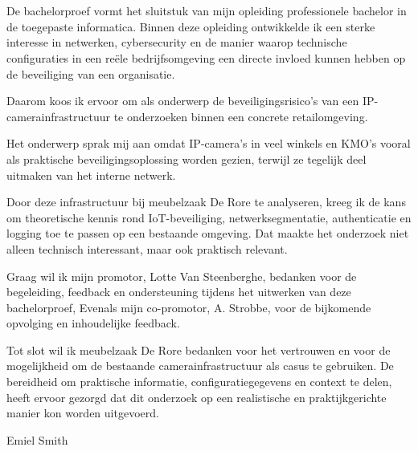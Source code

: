 
\chapter*{}%
\label{ch:voorwoord}


De bachelorproef vormt het sluitstuk van mijn opleiding professionele bachelor in de toegepaste informatica. Binnen deze opleiding ontwikkelde ik een sterke interesse in netwerken, cybersecurity en de manier waarop technische configuraties in een reële bedrijfsomgeving een directe invloed kunnen hebben op de beveiliging van een organisatie. 

Daarom koos ik ervoor om als onderwerp de beveiligingsrisico's van een IP-camerainfrastructuur te onderzoeken binnen een concrete retailomgeving.

Het onderwerp sprak mij aan omdat IP-camera's in veel winkels en KMO's vooral als praktische beveiligingsoplossing worden gezien, terwijl ze tegelijk deel uitmaken van het interne netwerk. 

Door deze infrastructuur bij meubelzaak De Rore te analyseren, kreeg ik de kans om theoretische kennis rond IoT-beveiliging, netwerksegmentatie, authenticatie en logging toe te passen op een bestaande omgeving. Dat maakte het onderzoek niet alleen technisch interessant, maar ook praktisch relevant.

Graag wil ik mijn promotor, Lotte Van Steenberghe, bedanken voor de begeleiding, feedback en ondersteuning tijdens het uitwerken van deze bachelorproef, Evenals mijn co-promotor, A. Strobbe, voor de bijkomende opvolging en inhoudelijke feedback.

Tot slot wil ik meubelzaak De Rore bedanken voor het vertrouwen en voor de mogelijkheid om de bestaande camerainfrastructuur als casus te gebruiken. De bereidheid om praktische informatie, configuratiegegevens en context te delen, heeft ervoor gezorgd dat dit onderzoek op een realistische en praktijkgerichte manier kon worden uitgevoerd.


\begin{flushright}
    Emiel Smith
\end{flushright}
